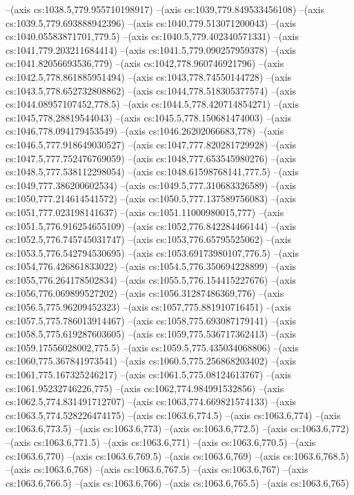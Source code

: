 --(axis cs:1038.5,779.955710198917)
--(axis cs:1039,779.849533456108)
--(axis cs:1039.5,779.693888942396)
--(axis cs:1040,779.513071200043)
--(axis cs:1040.05583871701,779.5)
--(axis cs:1040.5,779.402340571331)
--(axis cs:1041,779.203211684414)
--(axis cs:1041.5,779.090257959378)
--(axis cs:1041.82056693536,779)
--(axis cs:1042,778.960746921796)
--(axis cs:1042.5,778.861885951494)
--(axis cs:1043,778.74550144728)
--(axis cs:1043.5,778.652732808862)
--(axis cs:1044,778.518305377574)
--(axis cs:1044.08957107452,778.5)
--(axis cs:1044.5,778.420714854271)
--(axis cs:1045,778.28819544043)
--(axis cs:1045.5,778.150681474003)
--(axis cs:1046,778.094179453549)
--(axis cs:1046.26202066683,778)
--(axis cs:1046.5,777.918649030527)
--(axis cs:1047,777.820281729928)
--(axis cs:1047.5,777.752476769059)
--(axis cs:1048,777.653545980276)
--(axis cs:1048.5,777.538112298054)
--(axis cs:1048.61598768141,777.5)
--(axis cs:1049,777.386200602534)
--(axis cs:1049.5,777.310683326589)
--(axis cs:1050,777.214614541572)
--(axis cs:1050.5,777.137589756083)
--(axis cs:1051,777.023198141637)
--(axis cs:1051.11000980015,777)
--(axis cs:1051.5,776.916254655109)
--(axis cs:1052,776.842284466144)
--(axis cs:1052.5,776.745745031747)
--(axis cs:1053,776.65795525062)
--(axis cs:1053.5,776.542794530695)
--(axis cs:1053.69173980107,776.5)
--(axis cs:1054,776.426861833022)
--(axis cs:1054.5,776.350694228899)
--(axis cs:1055,776.264178502834)
--(axis cs:1055.5,776.154415227676)
--(axis cs:1056,776.069899527202)
--(axis cs:1056.31287486369,776)
--(axis cs:1056.5,775.96209452323)
--(axis cs:1057,775.881910716451)
--(axis cs:1057.5,775.786013914467)
--(axis cs:1058,775.693087179141)
--(axis cs:1058.5,775.619287603605)
--(axis cs:1059,775.536717362413)
--(axis cs:1059.17556028002,775.5)
--(axis cs:1059.5,775.435034068806)
--(axis cs:1060,775.367841973541)
--(axis cs:1060.5,775.256868203402)
--(axis cs:1061,775.167325246217)
--(axis cs:1061.5,775.08124613767)
--(axis cs:1061.95232746226,775)
--(axis cs:1062,774.984991532856)
--(axis cs:1062.5,774.831491712707)
--(axis cs:1063,774.669821574133)
--(axis cs:1063.5,774.528226474175)
--(axis cs:1063.6,774.5)
--(axis cs:1063.6,774)
--(axis cs:1063.6,773.5)
--(axis cs:1063.6,773)
--(axis cs:1063.6,772.5)
--(axis cs:1063.6,772)
--(axis cs:1063.6,771.5)
--(axis cs:1063.6,771)
--(axis cs:1063.6,770.5)
--(axis cs:1063.6,770)
--(axis cs:1063.6,769.5)
--(axis cs:1063.6,769)
--(axis cs:1063.6,768.5)
--(axis cs:1063.6,768)
--(axis cs:1063.6,767.5)
--(axis cs:1063.6,767)
--(axis cs:1063.6,766.5)
--(axis cs:1063.6,766)
--(axis cs:1063.6,765.5)
--(axis cs:1063.6,765)
